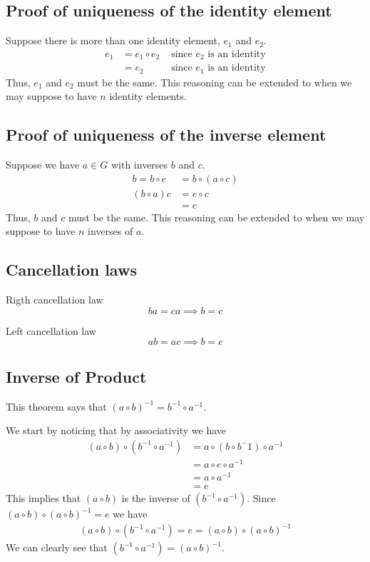 \documentclass[a4paper]{article}
\begin{document}
\subsection{Proof of uniqueness of the identity element}

Suppose there is more than one identity element, \(e_1\) and \(e_2\).
\begin{align*}
    e_1 &= e_1 \circ e_2 &\text { since \(e_2\) is an identity} \\
    &= e_2 &\text { since \(e_1\) is an identity}
\end{align*}
Thus, \(e_1\) and \(e_2\) must be the same. This reasoning can be extended
to when we may suppose to have \(n\) identity elements.

\subsection{Proof of uniqueness of the inverse element}

Suppose we have \(a\in G\) with inverses \(b\) and \(c\).
\begin{align*}
    b = b \circ e &= b \circ (a \circ c)\\
    (b \circ a) c &= e \circ c \\
    &= c
\end{align*}
Thus, \(b\) and \(c\) must be the same. This reasoning can be extended
to when we may suppose to have \(n\) inverses of \(a\).

\subsection{Cancellation laws}

Rigth cancellation law
\[
    ba = ca \implies b = c
\]

Left cancellation law
\[
    ab = ac \implies b = c
\]

\subsection{Inverse of Product}

This theorem says that \({(a \circ b)}^{-1} = b^{-1} \circ a^{-1}\).

We start by noticing that by associativity we have
\begin{align*}
    (a \circ b) \circ (b^{-1} \circ a^{-1}) &= a \circ (b \circ b^-1) \circ a^{-1} \\
    &= a \circ e \circ a^{-1} \\
    &= a \circ a^{-1} \\
    &= e
\end{align*}
This implies that \((a \circ b)\) is the inverse of \((b^{-1} \circ a^{-1})\).
Since \((a\circ b) \circ {(a \circ b)}^{-1} =e\) we have
\begin{align*}
    (a \circ b) \circ (b^{-1} \circ a^{-1}) = e = (a\circ b) \circ {(a \circ b)}^{-1}
\end{align*}
We can clearly see that \((b^{-1} \circ a^{-1}) = {(a \circ b)}^{-1}\).
\end{document}

